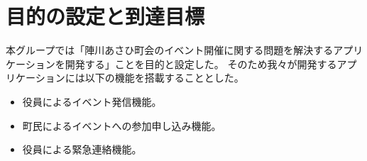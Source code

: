 \section{目的の設定と到達目標}
本グループでは「陣川あさひ町会のイベント開催に関する問題を解決するアプリケーションを開発する」ことを目的と設定した。
そのため我々が開発するアプリケーションには以下の機能を搭載することとした。
\begin{itemize}
    \item 役員によるイベント発信機能。
    \item 町民によるイベントへの参加申し込み機能。
    \item 役員による緊急連絡機能。
\end{itemize}
